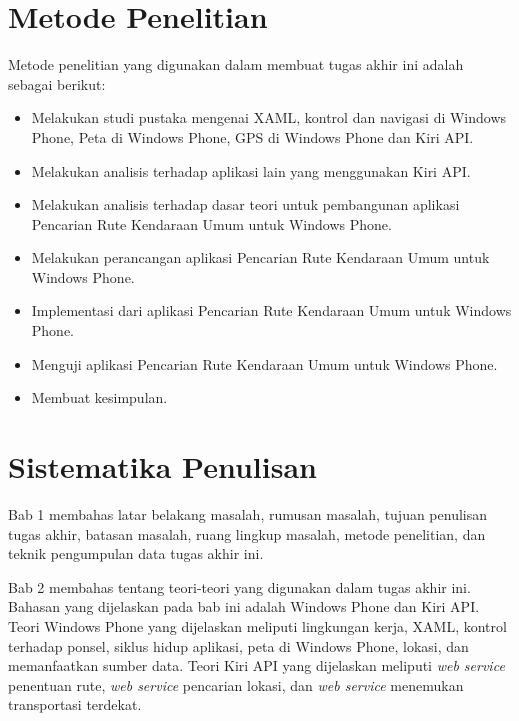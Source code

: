 \section{Metode Penelitian}
\label{sec:metode_penelitian}
Metode penelitian yang digunakan dalam membuat tugas akhir ini adalah sebagai berikut:
\begin{itemize}
	\item Melakukan studi pustaka mengenai XAML, kontrol dan navigasi di Windows Phone, Peta di Windows Phone, GPS di Windows Phone dan Kiri API.
	\item Melakukan analisis terhadap aplikasi lain yang menggunakan Kiri API.
	\item Melakukan analisis terhadap dasar teori untuk pembangunan aplikasi Pencarian Rute Kendaraan Umum untuk Windows Phone.
	\item Melakukan perancangan aplikasi Pencarian Rute Kendaraan Umum untuk Windows Phone.
	\item Implementasi dari aplikasi Pencarian Rute Kendaraan Umum untuk Windows Phone.
	\item Menguji aplikasi Pencarian Rute Kendaraan Umum untuk Windows Phone.
	\item Membuat kesimpulan.
\end{itemize}


\section{Sistematika Penulisan}
\label{sec:sistematika_penulisan}
\hspace{0.5cm} Bab 1 membahas latar belakang masalah, rumusan masalah, tujuan penulisan tugas akhir, batasan masalah, ruang lingkup masalah, metode penelitian, dan teknik pengumpulan data tugas akhir ini.

Bab 2 membahas tentang teori-teori yang digunakan dalam tugas akhir ini. Bahasan yang dijelaskan pada bab ini adalah Windows Phone dan Kiri API. Teori Windows Phone yang dijelaskan meliputi lingkungan kerja, XAML, kontrol terhadap ponsel, siklus hidup aplikasi, peta di Windows Phone, lokasi, dan memanfaatkan sumber data. Teori Kiri API yang dijelaskan meliputi \textit{web service} penentuan rute, \textit{web service} pencarian lokasi, dan \textit{web service} menemukan transportasi terdekat. 

